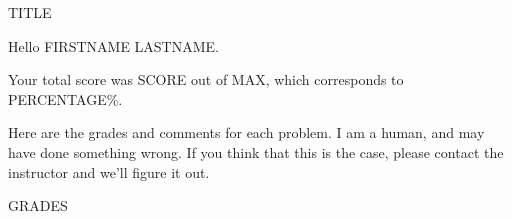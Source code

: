 \documentclass{scrartcl}
\begin{document}
\begin{center}
\textsc{TITLE}
\end{center}

Hello FIRSTNAME LASTNAME.

Your total score was SCORE out of MAX, which corresponds to PERCENTAGE\%.

Here are the grades and comments for each problem.
I am a human, and may have done something wrong.
If you think that this is the case, please contact the instructor and we'll figure it out.

GRADES
\end{document}
